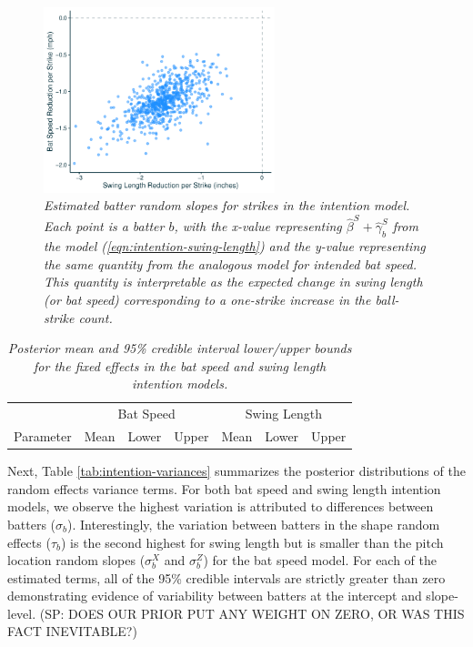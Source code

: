 \documentclass{article}
\begin{document}
      \begin{figure}[H]
        \centering
        \includegraphics[width = 0.6\textwidth]{../../figures/approach.pdf}
        \caption{\it Estimated batter random slopes for strikes in the intention model. Each point is a batter $b$, with the x-value representing $\hat\beta^S + \hat\gamma^S_b$ from the model (\ref{eqn:intention-swing-length}) and the y-value representing the same quantity from the analogous model for intended bat speed. This quantity is interpretable as the expected change in swing length (or bat speed) corresponding to a one-strike increase in the ball-strike count.}
        \label{fig:approach}
      \end{figure}

      \begin{table}[H]
        \centering
        \begin{tabular}{l|rrr|rrr|}
                  & \multicolumn{3}{c|}{Bat Speed}          & \multicolumn{3}{c|}{Swing Length}  \\
        Parameter & Mean  & Lower  & Upper & Mean  & Lower  & Upper \\
          \hline
          
        \end{tabular}
        \caption{\it Posterior mean and 95\% credible interval lower/upper bounds for the fixed effects in the bat speed and swing length intention models.}
        \label{tab:fixed-effects}
      \end{table}

      Next, Table \ref{tab:intention-variances} summarizes the posterior distributions of the random effects variance terms. For both bat speed and swing length intention models, we observe the highest variation is attributed to differences between batters ($\sigma_b$). Interestingly, the variation between batters in the shape random effects ($\tau_b$) is the second highest for swing length but is smaller than the pitch location random slopes ($\sigma_b^X$ and $\sigma_b^Z$) for the bat speed model. For each of the estimated terms, all of the 95\% credible intervals are strictly greater than zero demonstrating evidence of variability between batters at the intercept and slope-level. (SP: DOES OUR PRIOR PUT ANY WEIGHT ON ZERO, OR WAS THIS FACT INEVITABLE?)
       
\end{document}
